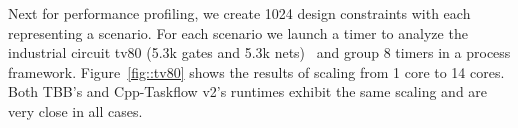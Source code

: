 \documentclass[conference]{IEEEtran}
\begin{document}

Next for performance profiling, we create 1024 design constraints with each representing a scenario.
For each scenario we launch a timer %
to analyze the industrial circuit tv80 (5.3k gates and 5.3k nets)~\cite{tau_2015} and 
group 8 timers in a process framework.
Figure~\ref{fig::tv80} shows the results of scaling from 1 core to 14 cores.
Both TBB's and Cpp-Taskflow v2's runtimes exhibit the same scaling and
are very close in all cases.
%
%

\end{document}
